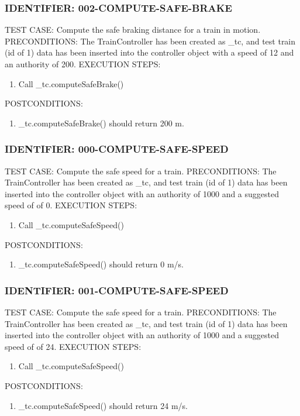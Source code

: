 \documentclass{scrreprt}
\begin{document}
\subsubsection{IDENTIFIER: 002-COMPUTE-SAFE-BRAKE}
TEST CASE: Compute the safe braking distance for a train in motion.
PRECONDITIONS: The TrainController has been created as _tc, and test train (id of 1) data has been inserted into the controller object with a speed of 12 and an authority of 200.
EXECUTION STEPS:
\begin{enumerate}
	\item Call _tc.computeSafeBrake()
\end{enumerate}
POSTCONDITIONS:
\begin{enumerate}
	\item _tc.computeSafeBrake() should return 200 m.
\end{enumerate}

\subsubsection{IDENTIFIER: 000-COMPUTE-SAFE-SPEED}
TEST CASE: Compute the safe speed for a train.
PRECONDITIONS: The TrainController has been created as _tc, and test train (id of 1) data has been inserted into the controller object with an authority of 1000 and a suggested speed of of 0.
EXECUTION STEPS:
\begin{enumerate}
	\item Call _tc.computeSafeSpeed()
\end{enumerate}
POSTCONDITIONS:
\begin{enumerate}
	\item _tc.computeSafeSpeed() should return 0 m/s.
\end{enumerate}

\subsubsection{IDENTIFIER: 001-COMPUTE-SAFE-SPEED}
TEST CASE: Compute the safe speed for a train.
PRECONDITIONS: The TrainController has been created as _tc, and test train (id of 1) data has been inserted into the controller object with an authority of 1000 and a suggested speed of of 24.
EXECUTION STEPS:
\begin{enumerate}
	\item Call _tc.computeSafeSpeed()
\end{enumerate}
POSTCONDITIONS:
\begin{enumerate}
	\item _tc.computeSafeSpeed() should return 24 m/s.
\end{enumerate}
\end{document}
